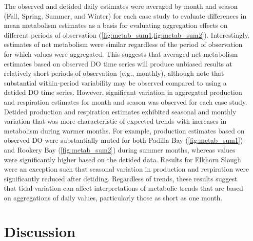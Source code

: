 \documentclass[letterpaper,12pt,oneside]{article}\usepackage[]{graphicx}\usepackage[]{color}
\begin{document}
The observed and detided daily estimates were averaged by month and season (Fall, Spring, Summer, and Winter) for each case study to evaluate differences in mean metabolism estimates as a basis for evaluating aggregation effects on different periods of observation (\cref{fig:metab_sum1,fig:metab_sum2}).  Interestingly, estimates of net metabolism were similar regardless of the period of observation for which values were aggregated.  This suggests that averaged net metabolism estimates based on observed \ac{DO} time series will produce unbiased results at relatively short periods of observation (e.g., monthly), although note that substantial within-period variability may be observed compared to using a detided \ac{DO} time series.  However, significant variation in aggregated production and respiration estimates for month and season was observed for each case study.  Detided production and respiration estimates exhibited seasonal and monthly variation that was more characteristic of expected trends with increases in metabolism during warmer months.  For example, production estimates based on observed \ac{DO} were substantially muted for both Padilla Bay (\cref{fig:metab_sum1}) and Rookery Bay (\cref{fig:metab_sum2}) during summer months, whereas values were significantly higher based on the detided data. Results for Elkhorn Slough were an exception such that seasonal variation in production and respiration were significantly reduced after detiding.  Regardless of trends, these results suggest that tidal variation can affect interpretations of metabolic trends that are based on aggregations of daily values, particularly those as short as one month.      

 

\section{Discussion}
\end{document}
